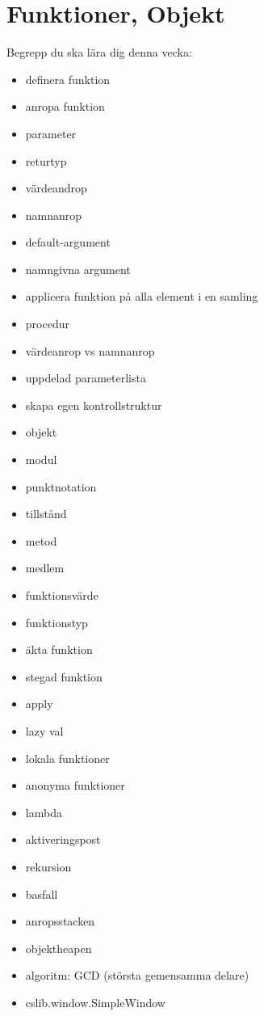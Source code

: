 \chapter{Funktioner, Objekt}\label{chapter:W03}
Begrepp du ska lära dig denna vecka:
\begin{multicols}{2}\begin{itemize}[noitemsep,label={$\square$},leftmargin=*]
\item definera funktion
\item anropa funktion
\item parameter
\item returtyp
\item värdeandrop
\item namnanrop
\item default-argument
\item namngivna argument
\item applicera funktion på alla element i en samling
\item procedur
\item värdeanrop vs namnanrop
\item uppdelad parameterlista
\item skapa egen kontrollstruktur
\item objekt
\item modul
\item punktnotation
\item tillstånd
\item metod
\item medlem
\item funktionsvärde
\item funktionstyp
\item äkta funktion
\item stegad funktion
\item apply
\item lazy val
\item lokala funktioner
\item anonyma funktioner
\item lambda
\item aktiveringspost
\item rekursion
\item basfall
\item anropsstacken
\item objektheapen
\item algoritm: GCD (största gemensamma delare)
\item cslib.window.SimpleWindow\end{itemize}\end{multicols}
